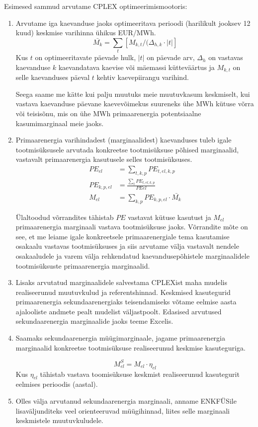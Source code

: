 \documentclass[10pt,a4paper]{article}
\begin{document}
Esimesed sammud arvutame CPLEX optimeerimismootoris:
\begin{enumerate}
\item Arvutame iga kaevanduse jaoks optimeeritava perioodi (harilikult jooksev 12 kuud) keskmise varihinna ühikus EUR/MWh. 
\begin{equation}
\bar{M_k} = \sum_t [M_{k,t} / (\Delta_{h,k} \cdot |t|]
\end{equation}
Kus $t$ on optimeeritavate päevade hulk, $|t|$ on päevade arv, $\Delta_h$ on vastavas kaevanduse $k$ kaevandatava kaevise või mäemassi kütteväärtus ja $M_{k,t}$ on selle kaevanduses päeval $t$ kehtiv kaevepiirangu varihind.

Seega saame me kätte kui palju muutuks meie muutuvkasum keskmiselt, kui vastava kaevanduse päevane kaevevõimekus suureneks ühe MWh kütuse võrra või teisisõnu, mis on ühe MWh primaarenergia potentsiaalne kasumimarginaal meie jaoks.

\item Primaarenergia varihindadest (marginaalidest) kaevanduses tuleb igale tootmisüksusele arvutada konkreetse tootmisüksuse põhised marginaalid, vastavalt primaarenergia kasutusele selles tootmisüksuses. 
\begin{align}
PE_{el} &= \sum_{t,k,p} PE_{t,el,k,p} \\
PE_{k,p,el} &= \frac{\sum_{t} PE_{t,el,k,p}}{PE{el}} \\
M_{el} &= \sum_{k,p} PE_{k,p,el} \cdot \bar{M_k} 
\end{align}

Ülaltoodud võrrandites tähistab $PE$ vastavat kütuse kasutust ja $M_{el}$ primaarenergia marginaali vastava tootmisüksuse jaoks. Võrrandite mõte on see, et me leiame igale konkreetsele primaarenergiale tema kasutamise osakaalu vastavas tootmisüksuses ja siis arvutame välja vastavalt nendele osakaaludele ja varem välja rehkendatud kaevandusepõhistele marginaalidele tootmisüksuste primaarenergia marginaalid.

\item Lisaks arvutatud marginaalidele salvestama CPLEXist maha mudelis realiseerunud muutuvkulud ja referentshinnad. Keskmised kasutegurid primaarenergia sekundaarenergiaks teisendamiseks võtame eelmise aasta ajalooliste andmete pealt mudelist väljastpoolt. Edasised arvutused sekundaarenergia marginaalide jaoks teeme Excelis.

\item Saamaks sekundaarenergia müügimarginaale, jagame primaarenergia marginaalid konkreetse tootmisüksuse realiseerunud keskmise kasuteguriga.

\begin{equation}
M^S_{el} = M_{el} \cdot \eta_{el}
\end{equation}
Kus $\eta_{el}$ tähistab vastava toomisüksuse keskmist realiseerunud kasutegurit eelmises perioodis (aastal).

\item Olles välja arvutanud sekundaarenergia marginaali, anname ENKFÜSile lisaväljunditeks veel orienteeruvad müügihinnad, liites selle marginaali keskmistele muutuvkuludele.

\end{enumerate}
\end{document}
